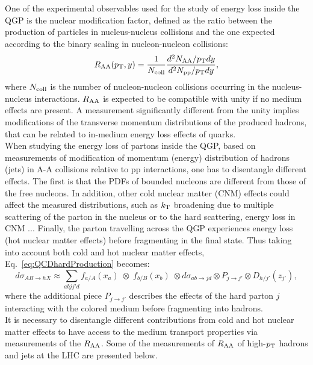 One of the experimental observables used for the study of energy loss
 inside the QGP is the nuclear modification factor, defined as the ratio 
 between the production of particles in nucleus-nucleus collisions and 
 the one expected according to the binary scaling in nucleon-nucleon collisions:
\begin{equation}
\label{eq:Raa}
R_{\rm AA} (p_{\rm T}, y) = \frac{1}{N_{\rm coll}}\frac{d^2N_{\rm AA}/p_{\rm T} dy}{d^2N_{\rm pp}/p_{\rm T} dy},
\end{equation}
where $N_{\rm coll}$ is the number of nucleon-nucleon collisions occurring
in the nucleus-nucleus interactions. $R_{\rm AA}$ is expected to be compatible 
with unity if no medium effects are present. A measurement significantly 
different from the unity implies modifications of the transverse momentum 
distributions of the produced hadrons, that can be related to in-medium 
energy loss effects of quarks.\\


When studying the energy loss of partons inside the QGP, based on
measurements of modification of momentum (energy) distribution of hadrons (jets)
in A-A collisions relative to pp interactions, one 
has to disentangle different effects. The first is that the PDFs of 
bounded nucleons are different from those of the free nucleons. In addition, 
other cold nuclear matter (CNM) effects could affect the measured distributions,
such as $k_{\rm T}$ broadening due to multiple scattering of the
parton in the nucleus or to the hard scattering, energy loss in CNM ... 
Finally, the parton travelling 
  across the QGP experiences energy loss (hot nuclear matter effects) 
  before fragmenting in the final state. Thus taking into account both cold and hot nuclear matter effects, 
Eq.~\ref{eq:QCDhardProduction} becomes:
\begin{equation}
\label{eq:QCDwNuclEffects}
d\sigma_{AB\rightarrow hX} \approx \sum_{abjj\prime d} f_{a/A} (x_a) \; \otimes \;f_{b/B} (x_b) \;\otimes d\sigma_{ab\rightarrow jd} \otimes P_{j\rightarrow j\prime} \otimes D_{h/j\prime}(z_{j\prime}), 
\end{equation}
where the additional piece $P_{j\rightarrow j\prime}$ describes the 
effects of the hard parton $j$ interacting with the colored medium 
before fragmenting into hadrons. \\

It is necessary to disentangle different contributions from cold and hot nuclear matter 
effects to have access to the medium transport properties via
 measurements of the $R_{\rm AA}$. Some of the measurements of $R_{\rm AA}$
  of high-$p_{\rm T}$ hadrons and jets at the LHC are presented below.

